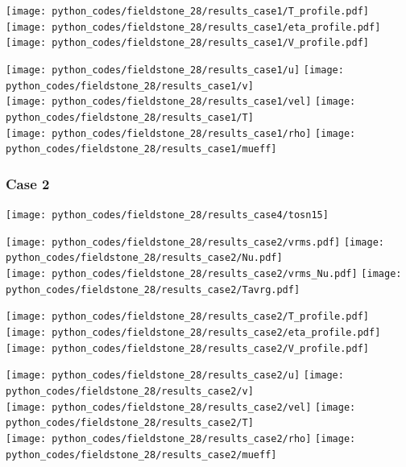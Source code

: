 \begin{center}
\texttt{[image: python\_codes/fieldstone\_28/results\_case1/T\_profile.pdf]}
\texttt{[image: python\_codes/fieldstone\_28/results\_case1/eta\_profile.pdf]}
\texttt{[image: python\_codes/fieldstone\_28/results\_case1/V\_profile.pdf]}
\end{center}
\newpage
\begin{center}
\texttt{[image: python\_codes/fieldstone\_28/results\_case1/u]}
\texttt{[image: python\_codes/fieldstone\_28/results\_case1/v]}\\
\texttt{[image: python\_codes/fieldstone\_28/results\_case1/vel]}
\texttt{[image: python\_codes/fieldstone\_28/results\_case1/T]}\\
\texttt{[image: python\_codes/fieldstone\_28/results\_case1/rho]}
\texttt{[image: python\_codes/fieldstone\_28/results\_case1/mueff]}
\end{center}









\newpage %
\subsubsection*{Case 2}

\texttt{[image: python\_codes/fieldstone\_28/results\_case4/tosn15]}

\begin{center}
\texttt{[image: python\_codes/fieldstone\_28/results\_case2/vrms.pdf]}
\texttt{[image: python\_codes/fieldstone\_28/results\_case2/Nu.pdf]}\\
\texttt{[image: python\_codes/fieldstone\_28/results\_case2/vrms\_Nu.pdf]}
\texttt{[image: python\_codes/fieldstone\_28/results\_case2/Tavrg.pdf]}
\end{center}

\begin{center}
\texttt{[image: python\_codes/fieldstone\_28/results\_case2/T\_profile.pdf]}
\texttt{[image: python\_codes/fieldstone\_28/results\_case2/eta\_profile.pdf]}
\texttt{[image: python\_codes/fieldstone\_28/results\_case2/V\_profile.pdf]}
\end{center}

\newpage
\begin{center}
\texttt{[image: python\_codes/fieldstone\_28/results\_case2/u]}
\texttt{[image: python\_codes/fieldstone\_28/results\_case2/v]}\\
\texttt{[image: python\_codes/fieldstone\_28/results\_case2/vel]}
\texttt{[image: python\_codes/fieldstone\_28/results\_case2/T]}\\
\texttt{[image: python\_codes/fieldstone\_28/results\_case2/rho]}
\texttt{[image: python\_codes/fieldstone\_28/results\_case2/mueff]}
\end{center}




